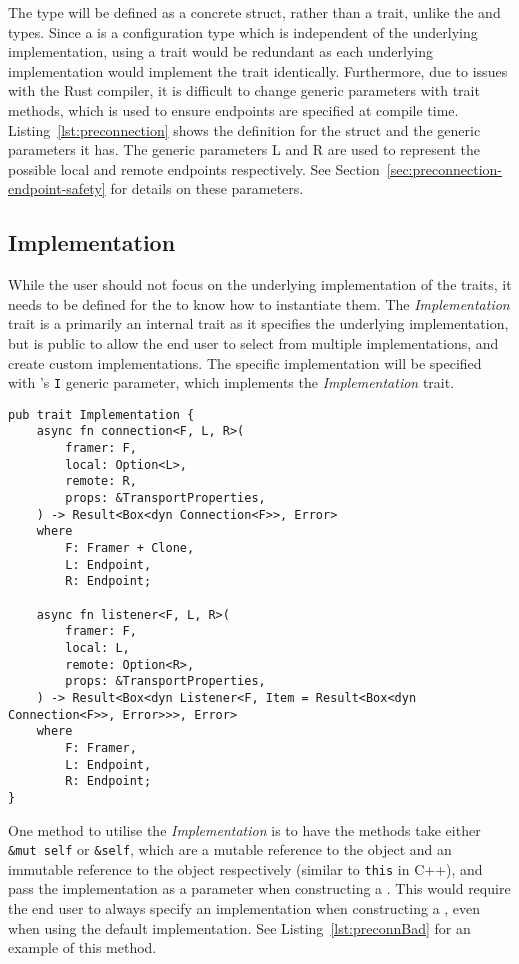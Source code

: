 The \preconnection{} type will be defined as a concrete struct, rather than a trait, unlike the \listener{} and
\connection{} types.
Since a \preconnection{} is a configuration type which is independent of the underlying implementation, using a
trait would be redundant as each underlying implementation would implement the trait identically.
Furthermore, due to issues with the Rust compiler, it is difficult to change generic parameters with trait methods,
which is used to ensure endpoints are specified at compile time.
Listing~\ref{lst:preconnection} shows the definition for the \preconnection{} struct and the generic parameters it
has.
The generic parameters L and R are used to represent the possible local and remote endpoints respectively.
See Section~\ref{sec:preconnection-endpoint-safety} for details on these parameters.

\subsection{Implementation}\label{subsec:implementation}
While the user should not focus on the underlying implementation of the traits, it needs to be defined for the
\preconnection{} to know how to instantiate them.
The \emph{Implementation} trait is a primarily an internal trait as it specifies the underlying implementation, but is
public to allow the end user to select from multiple implementations, and create custom implementations.
The specific implementation will be specified with \preconnection{}'s \texttt{I} generic parameter, which implements the
\emph{Implementation} trait.

\begin{lstlisting}[float=h, label=lst:impl, caption={The Implementation trait.}]
pub trait Implementation {
    async fn connection<F, L, R>(
        framer: F,
        local: Option<L>,
        remote: R,
        props: &TransportProperties,
    ) -> Result<Box<dyn Connection<F>>, Error>
    where
        F: Framer + Clone,
        L: Endpoint,
        R: Endpoint;

    async fn listener<F, L, R>(
        framer: F,
        local: L,
        remote: Option<R>,
        props: &TransportProperties,
    ) -> Result<Box<dyn Listener<F, Item = Result<Box<dyn Connection<F>>, Error>>>, Error>
    where
        F: Framer,
        L: Endpoint,
        R: Endpoint;
}
\end{lstlisting}

One method to utilise the \emph{Implementation} is to have the methods take either \texttt{\&mut self} or
\texttt{\&self}, which are a mutable reference to the object and an immutable reference to the object respectively
(similar to \texttt{this} in C++), and pass the implementation as a parameter when constructing a \preconnection{}.
This would require the end user to always specify an implementation when constructing a \preconnection{}, even when
using the default implementation.
See Listing~\ref{lst:preconnBad} for an example of this method.

